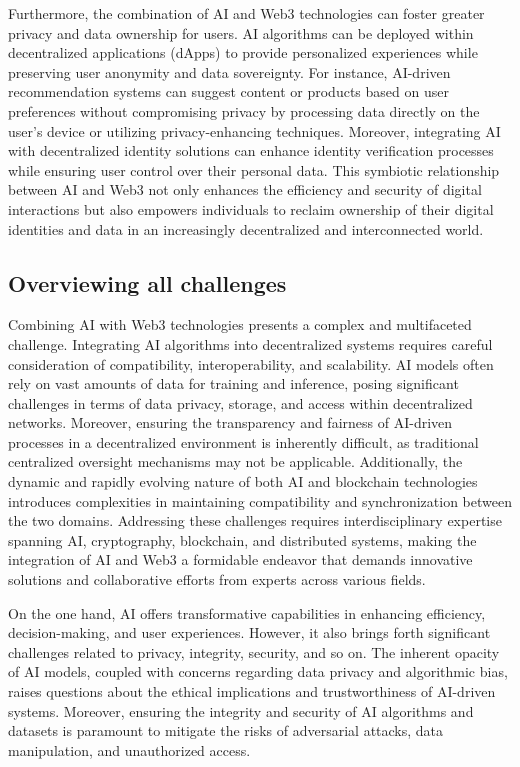 \documentclass[conference]{IEEEtran}
\begin{document}
Furthermore, the combination of AI and Web3 technologies can foster greater privacy and data ownership for users. AI algorithms can be deployed within decentralized applications (dApps) to provide personalized experiences while preserving user anonymity and data sovereignty. For instance, AI-driven recommendation systems can suggest content or products based on user preferences without compromising privacy by processing data directly on the user's device or utilizing privacy-enhancing techniques. Moreover, integrating AI with decentralized identity solutions can enhance identity verification processes while ensuring user control over their personal data. This symbiotic relationship between AI and Web3 not only enhances the efficiency and security of digital interactions but also empowers individuals to reclaim ownership of their digital identities and data in an increasingly decentralized and interconnected world.

\subsection{Overviewing all challenges}

Combining AI with Web3 technologies presents a complex and multifaceted challenge. Integrating AI algorithms into decentralized systems requires careful consideration of compatibility, interoperability, and scalability. AI models often rely on vast amounts of data for training and inference, posing significant challenges in terms of data privacy, storage, and access within decentralized networks. Moreover, ensuring the transparency and fairness of AI-driven processes in a decentralized environment is inherently difficult, as traditional centralized oversight mechanisms may not be applicable. Additionally, the dynamic and rapidly evolving nature of both AI and blockchain technologies introduces complexities in maintaining compatibility and synchronization between the two domains. Addressing these challenges requires interdisciplinary expertise spanning AI, cryptography, blockchain, and distributed systems, making the integration of AI and Web3 a formidable endeavor that demands innovative solutions and collaborative efforts from experts across various fields.

On the one hand, AI offers transformative capabilities in enhancing efficiency, decision-making, and user experiences. However, it also brings forth significant challenges related to privacy, integrity, security, and so on. The inherent opacity of AI models, coupled with concerns regarding data privacy and algorithmic bias, raises questions about the ethical implications and trustworthiness of AI-driven systems. Moreover, ensuring the integrity and security of AI algorithms and datasets is paramount to mitigate the risks of adversarial attacks, data manipulation, and unauthorized access.
\end{document}
